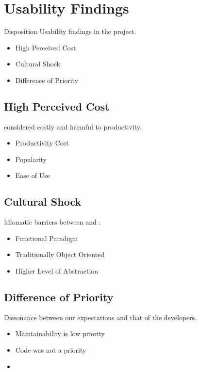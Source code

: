\section{Usability Findings}
\begin{frame}{\secname}{Disposition}
	Usability findings in the project.
	\begin{itemize}
		\item<2-> High Perceived Cost
		\item<3-> Cultural Shock
		\item<4-> Difference of Priority
	\end{itemize}
\end{frame}

\subsection{High Perceived Cost}
\begin{frame}{\secname}{\subsecname}
	\fs considered costly and harmful to productivity.
	\begin{itemize}
		\item<2-> Productivity Cost
		\item<3-> Popularity
		\item<4-> Ease of Use
	\end{itemize}
\end{frame}

\subsection{Cultural Shock}
\begin{frame}{\secname}{\subsecname}
	Idiomatic barriers between \cs and \fs.
	\begin{itemize}
		\item<2-> Functional Paradigm
		\item<3-> Traditionally Object Oriented
		\item<4-> Higher Level of Abstraction
	\end{itemize}
\end{frame}

\subsection{Difference of Priority}
\begin{frame}{\secname}{\subsecname}
	Dissonance between our expectations and that of the developers.
	\begin{itemize}
		\item<2-> Maintainability is low priority
		\item<3-> Code was not a priority
		\item<4-> 
	\end{itemize}
\end{frame}

